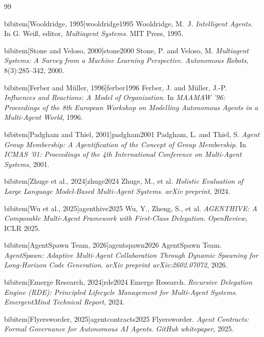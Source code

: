 \begin{thebibliography}{99}

bibitem[Wooldridge, 1995]{wooldridge1995}
 Wooldridge, M.~J. \newblock \emph{Intelligent Agents}.
 \newblock In G. Wei{\ss}, editor, \emph{Multiagent Systems}. MIT Press, 1995.

bibitem[Stone and Veloso, 2000]{stone2000}
 Stone, P. and Veloso, M. \newblock \emph{Multiagent Systems: A Survey from a Machine Learning Perspective}.
 \newblock \emph{Autonomous Robots}, 8(3):285--342, 2000.

bibitem[Ferber and M\"uller, 1996]{ferber1996}
 Ferber, J. and M\"uller, J.-P. \newblock \emph{Influences and Reactions: A Model of Organization}.
 \newblock In \emph{MAAMAW '96: Proceedings of the 8th European Workshop on Modelling Autonomous Agents in a Multi-Agent World}, 1996.

bibitem[Padgham and Thiel, 2001]{padgham2001}
 Padgham, L. and Thiel, S. \newblock \emph{Agent Group Membership: A Agentification of the Concept of Group Membership}.
 \newblock In \emph{ICMAS '01: Proceedings of the 4th International Conference on Multi-Agent Systems}, 2001.

bibitem[Zhuge et al., 2024]{zhuge2024}
 Zhuge, M., et al. \newblock \emph{Holistic Evaluation of Large Language Model-Based Multi-Agent Systems}.
 \newblock \emph{arXiv preprint}, 2024.

bibitem[Wu et al., 2025]{agenthive2025}
 Wu, Y., Zheng, S., et al. \newblock \emph{AGENTHIVE: A Composable Multi-Agent Framework with First-Class Delegation}.
 \newblock \emph{OpenReview}, ICLR 2025.

bibitem[AgentSpawn Team, 2026]{agentspawn2026}
 AgentSpawn Team. \newblock \emph{AgentSpawn: Adaptive Multi-Agent Collaboration Through Dynamic Spawning for Long-Horizon Code Generation}.
 \newblock \emph{arXiv preprint arXiv:2602.07072}, 2026.

bibitem[Emerge Research, 2024]{rde2024}
 Emerge Research. \newblock \emph{Recursive Delegation Engine (RDE): Principled Lifecycle Management for Multi-Agent Systems}.
 \newblock \emph{EmergentMind Technical Report}, 2024.

bibitem[Flyersworder, 2025]{agentcontracts2025}
 Flyersworder. \newblock \emph{Agent Contracts: Formal Governance for Autonomous AI Agents}.
 \newblock \emph{GitHub whitepaper}, 2025.


\end{thebibliography}
